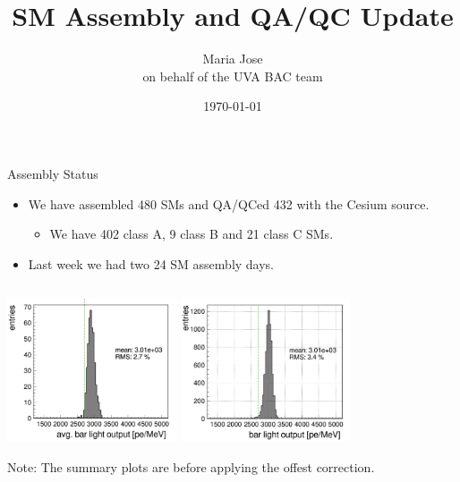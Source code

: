 \documentclass{beamer}
\title [BAC Discussion]{ SM Assembly and QA/QC Update}
\author[Maria Jose]{Maria Jose \\ on behalf of the UVA BAC team}
\date{\today}
\institute[UVA]{University of Virginia}
\begin{document}
\maketitle
\begin{frame}{Assembly Status}
\begin{itemize}
    \item We have assembled 480 SMs and QA/QCed 432 with the Cesium source.
    \begin{itemize}
        \item We have 402 class A, 9 class B and 21 class C SMs.
    \end{itemize}
    \item Last week we had two 24 SM assembly days.
\end{itemize}
\centering
\includegraphics[width=5cm, height=5cm]{../btl_files/summary_plots/summary_432.png}
\includegraphics[width =5cm, height =5cm]{../btl_files/summary_plots/summary_432_ch.png}\\
\small
Note: The summary plots are before applying the offest correction.
\end{frame}
\end{document}
